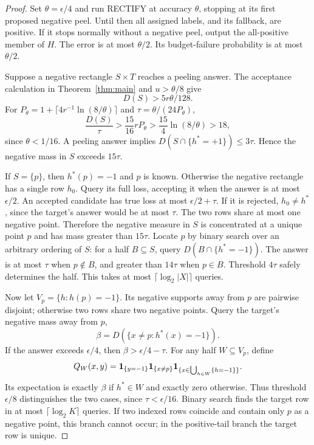 \begin{proof}
Set $\theta=\epsilon/4$ and run RECTIFY at accuracy $\theta$, stopping at its first proposed negative peel. Until then all assigned labels, and its fallback, are positive. If it stops normally without a negative peel, output the all-positive member of $H$. The error is at most $\theta/2$. Its budget-failure probability is at most $\theta/2$.

Suppose a negative rectangle $S\times T$ reaches a peeling answer. The acceptance calculation in Theorem~\ref{thm:main} and $u>\theta/8$ give
\[
 D(S)>5r\theta/128.
\]
For $P_\theta=1+\lceil4r^{-1}\ln(8/\theta)\rceil$ and $\tau=\theta/(24P_\theta)$,
\[
 \frac{D(S)}\tau>\frac{15}{16}rP_\theta
 >\frac{15}{4}\ln(8/\theta)>18,
\]
since $\theta<1/16$. A peeling answer implies $D(S\cap\{h^*=+1\})\le3\tau$. Hence the negative mass in $S$ exceeds $15\tau$.

If $S=\{p\}$, then $h^*(p)=-1$ and $p$ is known. Otherwise the negative rectangle has a single row $h_0$. Query its full loss, accepting it when the answer is at most $\epsilon/2$. An accepted candidate has true loss at most $\epsilon/2+\tau$. If it is rejected, $h_0\ne h^*$, since the target's answer would be at most $\tau$. The two rows share at most one negative point. Therefore the negative measure in $S$ is concentrated at a unique point $p$ and has mass greater than $15\tau$. Locate $p$ by binary search over an arbitrary ordering of $S$: for a half $B\subseteq S$, query $D(B\cap\{h^*=-1\})$. The answer is at most $\tau$ when $p\notin B$, and greater than $14\tau$ when $p\in B$. Threshold $4\tau$ safely determines the half. This takes at most $\lceil\log_2|X|\rceil$ queries.

Now let $V_p=\{h:h(p)=-1\}$. Its negative supports away from $p$ are pairwise disjoint; otherwise two rows share two negative points. Query the target's negative mass away from $p$,
\[
 \beta=D(\{x\ne p:h^*(x)=-1\}).
\]
If the answer exceeds $\epsilon/4$, then $\beta>\epsilon/4-\tau$. For any half $W\subseteq V_p$, define
\[
 Q_W(x,y)=\mathbf 1_{\{y=-1\}}\mathbf 1_{\{x\ne p\}}
 \mathbf 1_{\{x\in\bigcup_{h\in W}\{h=-1\}\}}.
\]
Its expectation is exactly $\beta$ if $h^*\in W$ and exactly zero otherwise. Thus threshold $\epsilon/8$ distinguishes the two cases, since $\tau<\epsilon/16$. Binary search finds the target row in at most $\lceil\log_2K\rceil$ queries. If two indexed rows coincide and contain only $p$ as a negative point, this branch cannot occur; in the positive-tail branch the target row is unique.


\end{proof}
